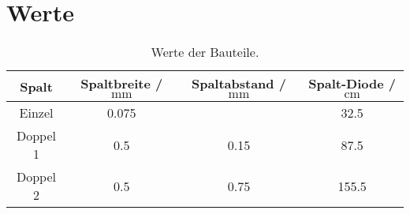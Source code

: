 \section{Werte}
\label{sec:werte}

\begin{table}
      \centering
      \caption{Werte der Bauteile.}
      \label{tab:bauteile}
      \begin{tabular}{c S[table-format=1.3] S[table-format=1.2] S[table-format=3.1] }
            \toprule
            {Spalt} & {Spaltbreite / $\si{\milli\meter}$}
            & {Spaltabstand / $\si{\milli\meter}$}
            & {Spalt-Diode / $\si{\centi\meter}$}\\
            \midrule
            Einzel   & 0.075 & & 32.5 \\
            Doppel 1 & 0.5 & 0.15 & 87.5 \\
            Doppel 2 & 0.5 & 0.75 & 155.5 \\
            \bottomrule
      \end{tabular}
\end{table}
%
%
